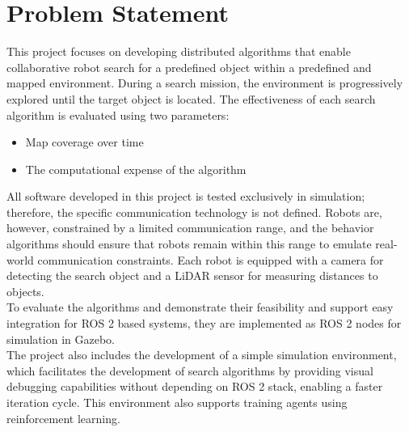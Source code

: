 \section{Problem Statement}
\label{sec:problem-statement}

This project focuses on developing distributed algorithms that enable collaborative robot search for a predefined object within a predefined and mapped environment. During a search mission, the environment is progressively explored until the target object is located. The effectiveness of each search algorithm is evaluated using two parameters:

\begin{itemize}
    \item Map coverage over time
    \item The computational expense of the algorithm
\end{itemize}

All software developed in this project is tested exclusively in simulation; therefore, the specific communication technology is not defined. Robots are, however, constrained by a limited communication range, and the behavior algorithms should ensure that robots remain within this range to emulate real-world communication constraints. Each robot is equipped with a camera for detecting the search object and a LiDAR sensor for measuring distances to objects. \\

To evaluate the algorithms and demonstrate their feasibility and support easy integration for ROS 2 based systems, they are implemented as ROS 2 nodes for simulation in Gazebo. \\

The project also includes the development of a simple simulation environment, which facilitates the development of search algorithms by providing visual debugging capabilities without depending on ROS 2 stack, enabling a faster iteration cycle. This environment also supports training agents using reinforcement learning.
